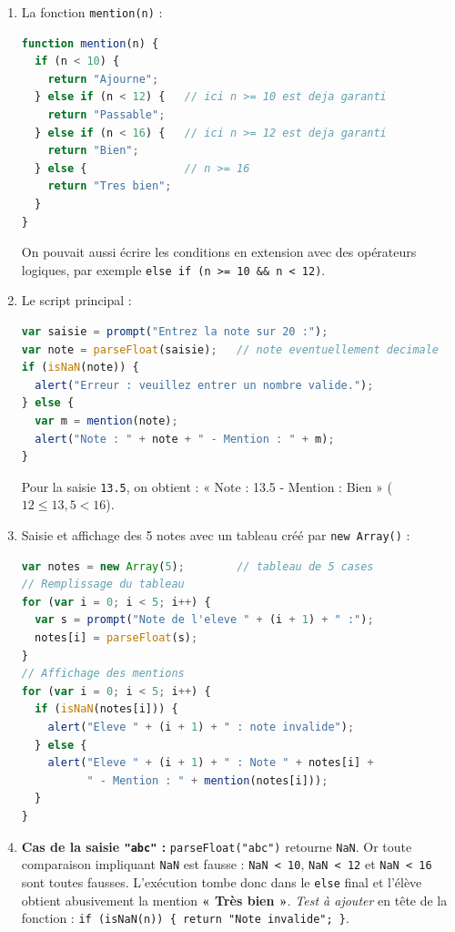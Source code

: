 \documentclass[11pt]{article}
\begin{document}
\begin{corrige}
\begin{enumerate}
\item La fonction \texttt{mention(n)} :
\begin{lstlisting}[language=JavaScript]
function mention(n) {
  if (n < 10) {
    return "Ajourne";
  } else if (n < 12) {   // ici n >= 10 est deja garanti
    return "Passable";
  } else if (n < 16) {   // ici n >= 12 est deja garanti
    return "Bien";
  } else {               // n >= 16
    return "Tres bien";
  }
}
\end{lstlisting}
On pouvait aussi écrire les conditions en extension avec des opérateurs logiques, par exemple \texttt{else if (n >= 10 \&\& n < 12)}.
\item Le script principal :
\begin{lstlisting}[language=JavaScript]
var saisie = prompt("Entrez la note sur 20 :");
var note = parseFloat(saisie);   // note eventuellement decimale
if (isNaN(note)) {
  alert("Erreur : veuillez entrer un nombre valide.");
} else {
  var m = mention(note);
  alert("Note : " + note + " - Mention : " + m);
}
\end{lstlisting}
Pour la saisie \texttt{13.5}, on obtient : « Note : 13.5 - Mention : Bien » ($12 \leq 13{,}5 < 16$).
\item Saisie et affichage des 5 notes avec un tableau créé par \texttt{new Array()} :
\begin{lstlisting}[language=JavaScript]
var notes = new Array(5);        // tableau de 5 cases
// Remplissage du tableau
for (var i = 0; i < 5; i++) {
  var s = prompt("Note de l'eleve " + (i + 1) + " :");
  notes[i] = parseFloat(s);
}
// Affichage des mentions
for (var i = 0; i < 5; i++) {
  if (isNaN(notes[i])) {
    alert("Eleve " + (i + 1) + " : note invalide");
  } else {
    alert("Eleve " + (i + 1) + " : Note " + notes[i] +
          " - Mention : " + mention(notes[i]));
  }
}
\end{lstlisting}
\item \textbf{Cas de la saisie \texttt{"abc"} :} \texttt{parseFloat("abc")} retourne \texttt{NaN}. Or toute comparaison impliquant \texttt{NaN} est fausse : \texttt{NaN < 10}, \texttt{NaN < 12} et \texttt{NaN < 16} sont toutes fausses. L'exécution tombe donc dans le \texttt{else} final et l'élève obtient abusivement la mention \textbf{« Très bien »}. \emph{Test à ajouter} en tête de la fonction : \texttt{if (isNaN(n)) \{ return "Note invalide"; \}}.
\end{enumerate}

\end{corrige}
\end{document}
